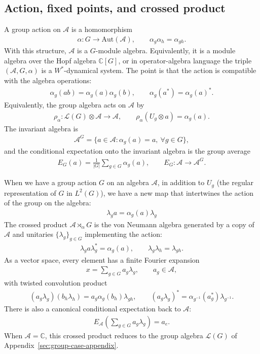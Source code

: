 \documentclass[11pt]{article}
\newcommand{\mA}{\mathcal{A}}
\begin{document}
\subsection{Action, fixed points, and crossed product}

A group action on $\mA$ is a homomorphism
\begin{align}
    \alpha:G\to \mathrm{Aut}(\mA),\qquad
    \alpha_g\alpha_h=\alpha_{gh}.
\end{align}
With this structure, $\mA$ is a $G$-module algebra. Equivalently, it is a
module algebra over the Hopf algebra $\mathbb C[G]$, or in operator-algebra
language the triple $(\mA,G,\alpha)$ is a $W^*$-dynamical system. The point is
that the action is compatible with the algebra operations:
\begin{align}
    \alpha_g(ab)=\alpha_g(a)\alpha_g(b),
    \qquad
    \alpha_g(a^*)=\alpha_g(a)^*.
\end{align}
Equivalently, the group algebra acts on $\mA$ by
\begin{align}
    \rho_\alpha:\mathcal L(G)\otimes \mA\to \mA,\qquad
    \rho_\alpha(U_g\otimes a)=\alpha_g(a).
\end{align}
The invariant algebra is
\begin{align}
    \mA^G=\{a\in\mA:\alpha_g(a)=a,\ \forall g\in G\},
\end{align}
and the conditional expectation onto the invariant algebra is the group average
\begin{align}
    E_G(a)=\frac{1}{|G|}\sum_{g\in G}\alpha_g(a),\qquad
    E_G:\mA\to\mA^G.
\end{align}

When we have a group action $G$ on an algebra $\mathcal{A}$, in addition to $U_g$ (the regular representation of $G$ in $L^2(G)$), we have a new map that intertwines the action of the group on the algebra:
\begin{align}
    \lambda_g a=\alpha_g(a) \lambda_g
\end{align}
The crossed product $\mA\rtimes_\alpha G$ is the von Neumann algebra generated
by a copy of $\mA$ and unitaries $\{\lambda_g\}_{g\in G}$ implementing the
action:
\begin{align}
    \lambda_g a\lambda_g^*=\alpha_g(a),\qquad
    \lambda_g\lambda_h=\lambda_{gh}.
\end{align}
As a vector space, every element has a finite Fourier expansion
\begin{align}
    x=\sum_{g\in G}a_g\lambda_g,\qquad a_g\in\mA,
\end{align}
with twisted convolution product
\begin{align}
    (a_g\lambda_g)(b_h\lambda_h)
    =a_g\alpha_g(b_h)\lambda_{gh},
    \qquad
    (a_g\lambda_g)^*=\alpha_{g^{-1}}(a_g^*)\lambda_{g^{-1}}.
\end{align}
There is also a canonical conditional expectation back to $\mA$:
\begin{align}
    E_{\mA}\left(\sum_{g\in G}a_g\lambda_g\right)=a_e.
\end{align}
When $\mA=\mathbb C$, this crossed product reduces to the group algebra
$\mathcal L(G)$ of Appendix~\ref{sec:group-case-appendix}.
\end{document}

